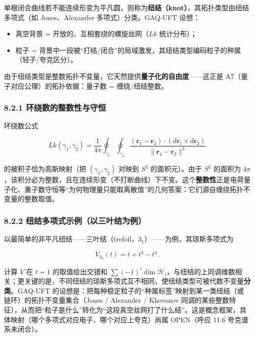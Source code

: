 单根闭合曲线若不能连续形变为平凡圆，则称为\textbf{纽结（knot）}，其拓扑类型由纽结多项式（如
Jones、Alexander 多项式）分类。GAQ‑UFT 设想：

\begin{itemize}
\tightlist
\item
  真空背景 = 开放的、互相套绕的螺旋丝网（\(Lk\) 统计分布）；
\item
  粒子 =
  背景中一段被``打结/闭合''的局域激发，其纽结类型编码粒子的种属（轻子/夸克区分）。
\end{itemize}

由于纽结类型是整数拓扑不变量，它天然提供\textbf{量子化的自由度}------这正是
A7（量子对应公理）的拓扑依据：量子数 = 缠绕/纽结整数。

\subsubsection{8.2.1
环绕数的整数性与守恒}\label{ux73afux7ed5ux6570ux7684ux6574ux6570ux6027ux4e0eux5b88ux6052}

环绕数公式

\[
Lk(\gamma_1,\gamma_2)=\frac{1}{4\pi}\oint_{\gamma_1}\oint_{\gamma_2}
\frac{(\mathbf{r}_1-\mathbf{r}_2)\cdot(d\mathbf{r}_1\times d\mathbf{r}_2)}{\|\mathbf{r}_1-\mathbf{r}_2\|^3}
\]

的被积子恰为高斯映射（把 \((\gamma_1,\gamma_2)\) 对映到 \(S^2\)
的面积元）。由于 \(S^2\) 的面积为
\(4\pi\)，该积分必为整数，且在连续形变（不打断曲线）下不变。这个\textbf{整数性}正是电荷量子化、重子数守恒等``为何物理量只能取离散值''的几何答案：它们源自缠绕拓扑不变量的整数取值。

\subsubsection{8.2.2
纽结多项式示例（以三叶结为例）}\label{ux7ebdux7ed3ux591aux9879ux5f0fux793aux4f8bux4ee5ux4e09ux53f6ux7ed3ux4e3aux4f8b}

以最简单的非平凡纽结------三叶结（trefoil，\(3_1\)）------为例，其琼斯多项式为

\[
V_{3_1}(t)=t+t^3-t^4.
\]

计算 \(V\) 在 \(t=1\) 的取值给出交错和
\(\sum(-1)^i\dim\mathcal{H}_i\)，与纽结的上同调维数相关；更关键的是，不同纽结的琼斯多项式互不相同，使纽结类型可被代数不变量\textbf{分类}。GAQ‑UFT
的设想是：把每种稳定粒子的``种属标签''映射到某一类纽结（或链环）的拓扑不变量集合（Jones
/ Alexander / Khovanov
同调的某些整数特征），从而把``粒子是什么''转化为``这段真空丝网打了什么结''。这是概念框架，具体映射（哪个多项式对应电子、哪个对应上夸克）尚属
OPEN（呼应 11.6 夸克谱系未闭合）。

